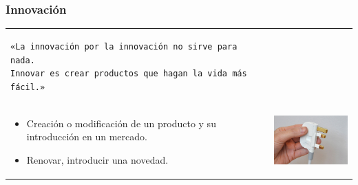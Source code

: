 \begin{frame}[fragile]
\frametitle{Innovación}
\begin{table}
\begin{tabular}{p{7cm}p{3cm}}
\small
\begin{verbatim}
«La innovación por la innovación no sirve para nada.
Innovar es crear productos que hagan la vida más fácil.»
\end{verbatim}&\\
\normalsize
\begin{itemize}
    \item Creación o modificación de un producto y su introducción en un
    mercado.
    \item Renovar, introducir una novedad.
\end{itemize}
&
\vspace{1cm}
\includegraphics[width=4cm]{img/enchufe.jpg}\\
\end{tabular}
\end{table}
\end{frame}

